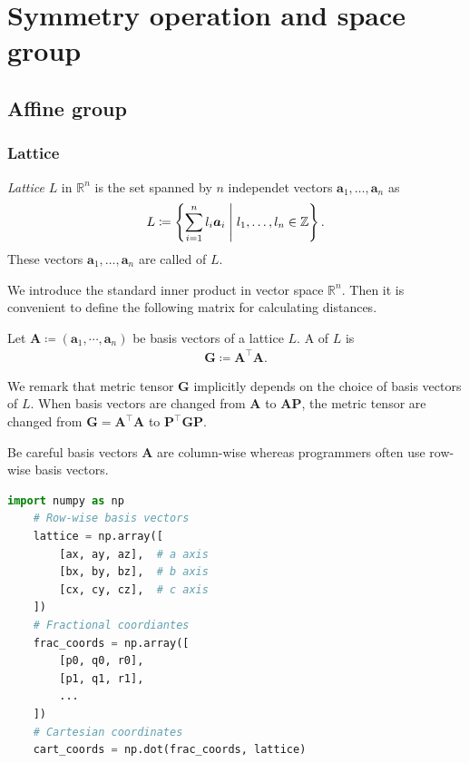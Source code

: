 \section{\label{sec:operation}Symmetry operation and space group}

\subsection{Affine group}

\subsubsection{Lattice}

\begin{screen}
  \begin{definition}[lattice]
    \textit{Lattice} $L$ in $\mathbb{R}^{n}$ is the set spanned by $n$ independet vectors $\bm{a}_{1}, \dots, \bm{a}_{n}$ as
    \begin{align}
      L \coloneqq \left\{  \sum_{i=1}^{n} l_{i} \bm{a}_{i}  \mathrel{}\middle|\mathrel{}  l_{1}, \dots, l_{n} \in \mathbb{Z}  \right\}.
    \end{align}
    These vectors $\bm{a}_{1}, \dots, \bm{a}_{n}$ are called  of $L$.
  \end{definition}
\end{screen}

We introduce the standard inner product in vector space $\mathbb{R}^{n}$.
Then it is convenient to define the following matrix for calculating distances.

\begin{screen}
  \begin{definition}
    Let $\mathbf{A} \coloneqq ( \mathbf{a}_{1}, \cdots, \mathbf{a}_{n} )$ be basis vectors of a lattice $L$.
    A  of $L$ is
    \begin{align}
      \bm{G} \coloneqq \bm{A}^{\top} \bm{A}.
    \end{align}
  \end{definition}
\end{screen}

We remark that metric tensor $\bm{G}$ implicitly depends on the choice of basis vectors of $L$.
When basis vectors are changed from $\bm{A}$ to $\bm{AP}$, the metric tensor are changed from $ \bm{G} = \bm{A}^{\top} \bm{A}$ to $\bm{P}^{\top} \bm{GP}$.

Be careful basis vectors $\bm{A}$ are column-wise whereas programmers often use row-wise basis vectors.
\begin{lstlisting}[language=Python]
    import numpy as np
    # Row-wise basis vectors
    lattice = np.array([
        [ax, ay, az],  # a axis
        [bx, by, bz],  # b axis
        [cx, cy, cz],  # c axis
    ])
    # Fractional coordiantes
    frac_coords = np.array([
        [p0, q0, r0],
        [p1, q1, r1],
        ...
    ])
    # Cartesian coordinates
    cart_coords = np.dot(frac_coords, lattice)
\end{lstlisting}

